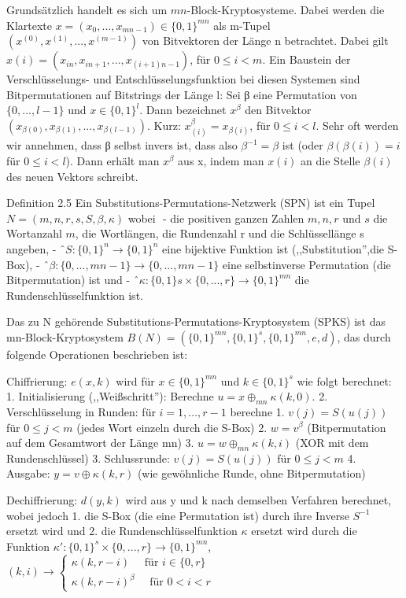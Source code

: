 \documentclass[a4paper]{article}
\begin{document}
\begin{multicols}{3}
    Grundsätzlich handelt es sich um $mn$-Block-Kryptosysteme. Dabei werden die Klartexte $x=(x_0,...,x_{mn-1})\in\{ 0,1\}^{mn}$ als m-Tupel $(x^{(0)},x^{(1)},...,x^{(m-1)})$ von Bitvektoren der Länge n betrachtet. Dabei gilt $x(i)=(x_{in},x_{in+1},...,x_{(i+1)n-1})$, für $0\leq i<m$.
    Ein Baustein der Verschlüsselungs- und Entschlüsselungsfunktion bei diesen Systemen sind Bitpermutationen  auf Bitstrings der Länge l: Sei β eine Permutation von $\{0,...,l-1\}$ und $x\in\{0,1\}^l$. Dann bezeichnet $x^β$ den Bitvektor $(x_{β(0)},x_{β(1)},...,x_{β(l-1)})$. Kurz: $x^β_{(i)}=x_{β(i)}$, für $0\leq i<l$.
    Sehr oft werden wir annehmen, dass β selbst invers ist, dass also $β^{-1}=β$ ist (oder $β(β(i))=i$ für $0\leq i<l$). Dann erhält man $x^β$ aus x, indem man $x(i)$ an die Stelle $β(i)$ des neuen Vektors schreibt.

    Definition 2.5 Ein Substitutions-Permutations-Netzwerk (SPN) ist ein Tupel $N=(m,n,r,s,S,\beta,\kappa)$ wobei 
    - die positiven ganzen Zahlen $m,n,r$ und $s$ die Wortanzahl $m$, die Wortlängen, die Rundenzahl r und die Schlüssellänge s angeben,
    - $S:\{0,1\}^n\rightarrow\{0,1\}^n$ eine bijektive Funktion ist (,,Substitution'',die S-Box),
    - $β:\{0,...,mn-1\}\rightarrow\{0,...,mn-1\}$ eine selbstinverse Permutation (die Bitpermutation) ist und
    - $\kappa :\{0,1\}s\times\{0,...,r\}\rightarrow\{0,1\}^{mn}$ die Rundenschlüsselfunktion ist.

    Das zu N gehörende Substitutions-Permutations-Kryptosystem (SPKS) ist das mn-Block-Kryptosystem $B(N)=(\{0,1\}^{mn},\{0,1\}^s,\{0,1\}^{mn},e,d)$, das durch folgende Operationen beschrieben ist:

    Chiffrierung: $e(x,k)$ wird für $x\in\{0,1\}^{mn}$ und $k\in\{0,1\}^s$ wie folgt berechnet:
    1. Initialisierung (,,Weißschritt''): Berechne $u=x\oplus_{mn} \kappa (k,0)$.
    2. Verschlüsselung in Runden: für $i=1,...,r-1$ berechne
    1. $v(j)=S(u(j))$ für $0\leq j<m$ (jedes Wort einzeln durch die S-Box)
    2. $w=v^β$ (Bitpermutation auf dem Gesamtwort der Länge mn)
    3. $u=w\oplus_{mn} \kappa (k,i)$ (XOR mit dem Rundenschlüssel)
    3. Schlussrunde: $v(j)=S(u(j))$ für $0\leq j<m$
    4. Ausgabe: $y=v\oplus \kappa (k,r)$ (wie gewöhnliche Runde, ohne Bitpermutation)

    Dechiffrierung: $d(y,k)$ wird aus y und k nach demselben Verfahren berechnet, wobei jedoch
    1. die S-Box (die eine Permutation ist) durch ihre Inverse $S^{-1}$ ersetzt wird und
    2. die Rundenschlüsselfunktion $\kappa$ ersetzt wird durch die Funktion $\kappa′:\{0,1\}^s\times\{0,...,r\}\rightarrow\{0,1\}^{mn}$, $(k,i)\rightarrow\begin{cases} \kappa (k,r-i)\quad\text{ für } i\in\{0,r\}\\ \kappa(k,r-i)^{\beta} \quad\text{ für } 0<i<r \end{cases}$


\end{multicols}
\end{document}
